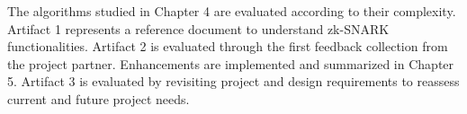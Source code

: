 The algorithms studied in Chapter 4 are evaluated according to their complexity. Artifact 1 represents a reference document to understand zk-SNARK functionalities. Artifact 2 is evaluated through the first feedback collection from the project partner. Enhancements are implemented and summarized in Chapter 5. Artifact 3 is evaluated by revisiting project and design requirements to reassess current and future project needs.

